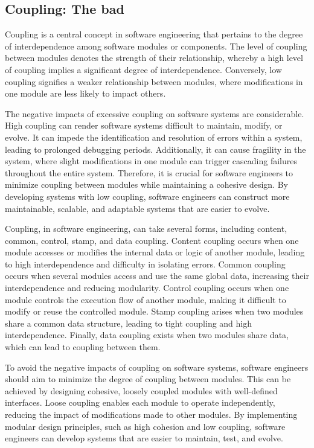 \subsection{Coupling: The bad} \label{subsec:on_coupling}

Coupling is a central concept in software engineering that pertains to the degree of
interdependence among software modules or components. The level of coupling between
modules denotes the strength of their relationship, whereby a high level of coupling
implies a significant degree of interdependence. Conversely, low coupling signifies a
weaker relationship between modules, where modifications in one module are less likely to
impact others.

The negative impacts of excessive coupling on software systems are considerable. High
coupling can render software systems difficult to maintain, modify, or evolve. It can
impede the identification and resolution of errors within a system, leading to prolonged
debugging periods. Additionally, it can cause fragility in the system, where slight
modifications in one module can trigger cascading failures throughout the entire system.
Therefore, it is crucial for software engineers to minimize coupling between modules while
maintaining a cohesive design. By developing systems with low coupling, software engineers
can construct more maintainable, scalable, and adaptable systems that are easier to evolve.

Coupling, in software engineering, can take several forms, including content, common,
control, stamp, and data coupling. Content coupling occurs when one module accesses or
modifies the internal data or logic of another module, leading to high interdependence and
difficulty in isolating errors. Common coupling occurs when several modules access and use
the same global data, increasing their interdependence and reducing modularity. Control
coupling occurs when one module controls the execution flow of another module, making it
difficult to modify or reuse the controlled module. Stamp coupling arises when two modules
share a common data structure, leading to tight coupling and high interdependence.
Finally, data coupling exists when two modules share data, which can lead to coupling
between them.

To avoid the negative impacts of coupling on software systems, software engineers should
aim to minimize the degree of coupling between modules. This can be achieved by designing
cohesive, loosely coupled modules with well-defined interfaces. Loose coupling enables
each module to operate independently, reducing the impact of modifications made to other
modules. By implementing modular design principles, such as high cohesion and low
coupling, software engineers can develop systems that are easier to maintain, test, and
evolve.


